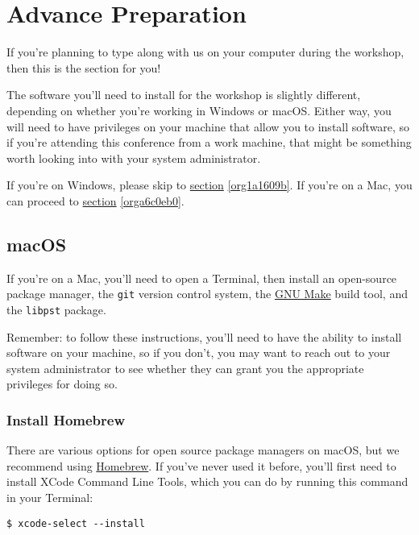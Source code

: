 \documentclass[11pt]{article}
\begin{document}
\section{Advance Preparation \label{org1fd8c0a}}
\label{sec:orgd29a629}

If you're planning to type along with us on your computer during the
workshop, then this is the section for you!

The software you'll need to install for the workshop is slightly
different, depending on whether you're working in Windows or macOS.
Either way, you will need to have privileges on your machine that
allow you to install software, so if you're attending this conference
from a work machine, that might be something worth looking into with
your system administrator.

If you're on Windows, please skip to \hyperref[org1a1609b]{section} \ref{org1a1609b}.  If you're on a
Mac, you can proceed to \hyperref[orga6c0eb0]{section} \ref{orga6c0eb0}.

\subsection{macOS \label{orga6c0eb0}}
\label{sec:org3d41b5d}

If you're on a Mac, you'll need to open a Terminal, then install an
open-source package manager, the \texttt{git} version control system, the
\href{https://www.gnu.org/software/make/}{GNU Make} build tool, and the
\texttt{libpst} package.

Remember: to follow these instructions, you'll need to have the
ability to install software on your machine, so if you don't, you may
want to reach out to your system administrator to see whether they can
grant you the appropriate privileges for doing so.

\subsubsection{Install Homebrew}
\label{sec:org7e5f85d}

There are various options for open source package managers on macOS,
but we recommend using \href{https://brew.sh}{Homebrew}.  If you've never used it
before, you'll first need to install XCode Command Line Tools, which
you can do by running this command in your Terminal:

\begin{verbatim}
$ xcode-select --install
\end{verbatim}
\end{document}
